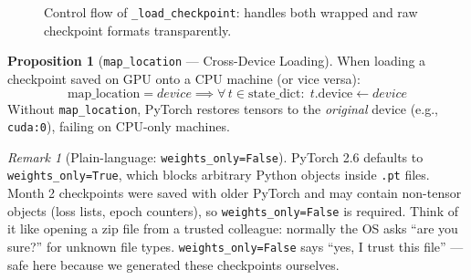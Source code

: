 \documentclass[12pt,a4paper]{article}
\theoremstyle{definition}
\newtheorem{proposition}[theorem]{Proposition}
\theoremstyle{remark}
\newtheorem{remark}[theorem]{Remark}
\begin{document}
\begin{figure}[H]
\centering
{}
\caption{Control flow of \texttt{\_load\_checkpoint}: handles both
wrapped and raw checkpoint formats transparently.}
\label{fig:load_ckpt}
\end{figure}

\begin{proposition}[\texttt{map\_location} — Cross-Device Loading]
When loading a checkpoint saved on GPU onto a CPU machine (or vice versa):
\[
  \text{map\_location} = \textit{device}
  \implies \forall\, t \in \text{state\_dict}:\;
  t.\text{device} \leftarrow \textit{device}
\]
Without \texttt{map\_location}, PyTorch restores tensors to the
\emph{original} device (e.g., \texttt{cuda:0}), failing on CPU-only machines.
\end{proposition}

\begin{remark}[Plain-language: \texttt{weights\_only=False}]
PyTorch 2.6 defaults to \texttt{weights\_only=True}, which blocks arbitrary
Python objects inside \texttt{.pt} files.
Month 2 checkpoints were saved with older PyTorch and may contain non-tensor
objects (loss lists, epoch counters), so \texttt{weights\_only=False} is required.
Think of it like opening a zip file from a trusted colleague:
normally the OS asks ``are you sure?'' for unknown file types.
\texttt{weights\_only=False} says ``yes, I trust this file'' — safe here
because we generated these checkpoints ourselves.
\end{remark}
\end{document}
